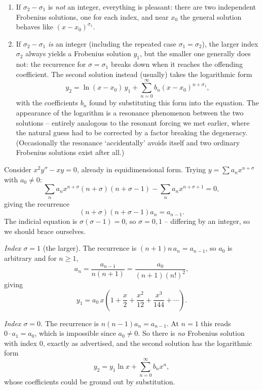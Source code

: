 \documentclass[a4paper]{scrartcl}
\begin{document}
\begin{enumerate}[label=(\arabic*)]
	\item If $\sigma_2 - \sigma_1$ is \emph{not} an integer, everything is pleasant: there are two independent Frobenius solutions, one for each index, and near $x_0$ the general solution behaves like $(x - x_0)^{\sigma_1}$.
	\item If $\sigma_2 - \sigma_1$ \emph{is} an integer (including the repeated case $\sigma_1 = \sigma_2$), the larger index $\sigma_2$ always yields a Frobenius solution $y_1$, but the smaller one generally does not: the recurrence for $\sigma = \sigma_1$ breaks down when it reaches the offending coefficient. The second solution instead (usually) takes the logarithmic form
	$$
	y_2 = \ln(x - x_0) \, y_1 + \sum_{n = 0}^{\infty} b_n (x - x_0)^{n + \sigma_1},
	$$
	with the coefficients $b_n$ found by substituting this form into the equation. The appearance of the logarithm is a resonance phenomenon between the two solutions -- entirely analogous to the resonant forcing we met earlier, where the natural guess had to be corrected by a factor breaking the degeneracy. (Occasionally the resonance `accidentally' avoids itself and two ordinary Frobenius solutions exist after all.)
\end{enumerate}

\begin{example}
	Consider $x^2 y'' - xy = 0$, already in equidimensional form. Trying $y = \sum a_n x^{n + \sigma}$ with $a_0 \neq 0$:
	$$
	\sum_n a_n x^{n + \sigma}(n + \sigma)(n + \sigma - 1) - \sum_n a_n x^{n + \sigma + 1} = 0,
	$$
	giving the recurrence
	$$
	(n + \sigma)(n + \sigma - 1) a_n = a_{n - 1}.
	$$
	The indicial equation is $\sigma(\sigma - 1) = 0$, so $\sigma = 0, 1$ -- differing by an integer, so we should brace ourselves.

	\emph{Index $\sigma = 1$} (the larger). The recurrence is $(n + 1)n \, a_n = a_{n - 1}$, so $a_0$ is arbitrary and for $n \geq 1$,
	$$
	a_n = \frac{a_{n - 1}}{n(n + 1)} = \frac{a_0}{(n + 1)(n!)^2},
	$$
	giving
	$$
	y_1 = a_0 \, x \left(1 + \frac x2 + \frac{x^2}{12} + \frac{x^3}{144} + \cdots\right).
	$$

	\emph{Index $\sigma = 0$.} The recurrence is $n(n - 1) a_n = a_{n - 1}$. At $n = 1$ this reads $0 \cdot a_1 = a_0$, which is impossible since $a_0 \neq 0$. So there is \emph{no} Frobenius solution with index $0$, exactly as advertised, and the second solution has the logarithmic form
	$$
	y_2 = y_1 \ln x + \sum_{n = 0}^{\infty} b_n x^n,
	$$
	whose coefficients could be ground out by substitution.
\end{example}
\end{document}
